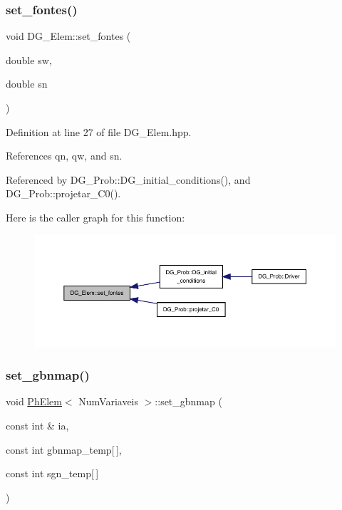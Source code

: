 \subsubsection{\texorpdfstring{set\+\_\+fontes()}{set\_fontes()}}
{\footnotesize\ttfamily void D\+G\+\_\+\+Elem\+::set\+\_\+fontes (\begin{DoxyParamCaption}\item[{double}]{sw,  }\item[{double}]{sn }\end{DoxyParamCaption})\hspace{0.3cm}{\ttfamily [inline]}}



Definition at line 27 of file D\+G\+\_\+\+Elem.\+hpp.



References qn, qw, and sn.



Referenced by D\+G\+\_\+\+Prob\+::\+D\+G\+\_\+initial\+\_\+conditions(), and D\+G\+\_\+\+Prob\+::projetar\+\_\+\+C0().

Here is the caller graph for this function\+:
\nopagebreak
\begin{figure}[H]
\begin{center}
\leavevmode
\includegraphics[width=350pt]{classDG__Elem_a9f7165dbb388e11f16b4249383f71d0e_icgraph}
\end{center}
\end{figure}
\mbox{\label{classPhElem_afba886f63bf7b67bd0a4164eae4dde5b}} 
\subsubsection{\texorpdfstring{set\+\_\+gbnmap()}{set\_gbnmap()}}
{\footnotesize\ttfamily void \hyperlink{classPhElem}{Ph\+Elem}$<$ Num\+Variaveis $>$\+::set\+\_\+gbnmap (\begin{DoxyParamCaption}\item[{const int \&}]{ia,  }\item[{const int}]{gbnmap\+\_\+temp\mbox{[}$\,$\mbox{]},  }\item[{const int}]{sgn\+\_\+temp\mbox{[}$\,$\mbox{]} }\end{DoxyParamCaption})\hspace{0.3cm}{\ttfamily [inherited]}}



